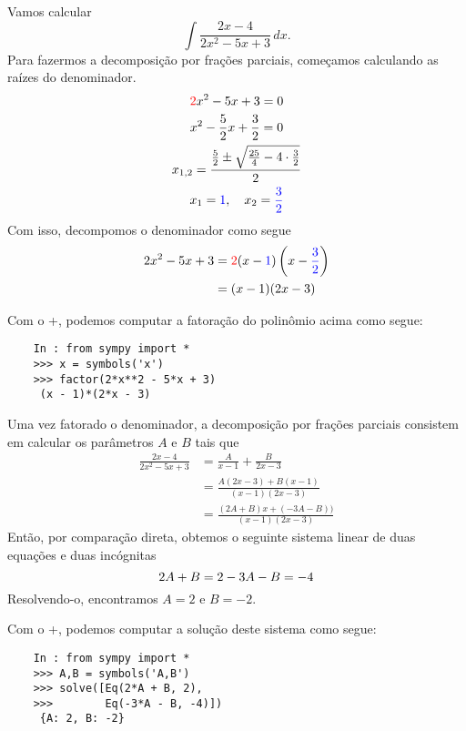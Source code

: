 \begin{ex}
  Vamos calcular
  \begin{equation}
    \int \frac{2x-4}{2x^2 - 5x + 3}\,dx.
  \end{equation}
  Para fazermos a decomposição por frações parciais, começamos calculando as raízes do denominador.
  \begin{gather}
    {\color{red}2}x^2 - 5x + 3 = 0\\
    x^2 - \frac{5}{2}x + \frac{3}{2} = 0\\
    x_{1,2} = \frac{\frac{5}{2} \pm \sqrt{\frac{25}{4} - 4\cdot \frac{3}{2}}}{2}\\
    x_1 = {\color{blue}1},\quad x_2 = {\color{blue}\frac{3}{2}}
  \end{gather}
  Com isso, decompomos o denominador como segue
  \begin{align}
    2x^2 - 5x + 3 &= {\color{red}2}(x-{\color{blue}1})\left(x-{\color{blue}\frac{3}{2}}\right)\\
                  &= (x-1)(2x-3)
  \end{align}

  \ifispython
  Com o {\python}+{\sympy}, podemos computar a fatoração do polinômio acima como segue:
  \begin{lstlisting}
    In : from sympy import *
    >>> x = symbols('x')
    >>> factor(2*x**2 - 5*x + 3)
     (x - 1)*(2*x - 3)
  \end{lstlisting}
  \fi

  Uma vez fatorado o denominador, a decomposição por frações parciais consistem em calcular os parâmetros $A$ e $B$ tais que
  \begin{align}
    \frac{2x-4}{2x^2 - 5x + 3} &= \frac{A}{x-1} + \frac{B}{2x-3}\\
                               &= \frac{A(2x-3) + B(x-1)}{(x-1)(2x-3)}\\
                               &= \frac{(2A+B)x + (-3A - B))}{(x-1)(2x-3)}
  \end{align}
  Então, por comparação direta, obtemos o seguinte sistema linear de duas equações e duas incógnitas
  \begin{equation}
    2A + B = 2\\
    -3A - B = -4
  \end{equation}
  Resolvendo-o, encontramos $A = 2$ e $B = -2$.

  \ifispython
  Com o {\python}+{\sympy}, podemos computar a solução deste sistema como segue:
  \begin{lstlisting}
    In : from sympy import *
    >>> A,B = symbols('A,B')
    >>> solve([Eq(2*A + B, 2),
    >>>        Eq(-3*A - B, -4)])
     {A: 2, B: -2}
  \end{lstlisting}
  \fi


\end{ex}
